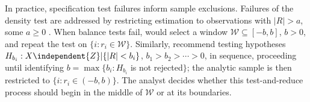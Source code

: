 In practice, specification test failures inform sample exclusions.
Failures of the density test are addressed by restricting
estimation to observations with $|R|>a$, some $a \geq 0$
\citep[e.g.,][]{barrecaetal2011birthweightRDD,eggers2014validity}.
When balance tests fail,
\citet{lee2010regression} would select a window
$\mathcal{W} \subseteq [-b, b]$, $b>0$, %
and repeat the test on $\{i : r_{i} \in \mathcal{W}\}$. Similarly,
\citet{cattaneo2014randomization} recommend testing hypotheses
$H_{b_{i}}: {X} \independent {Z}| \{|R| < b_{i}\}$, $b_1 > b_2 > \cdots >0$, in sequence,
proceeding until identifying  $b = \max \{ b_i: H_{b_{i}}$ is not rejected$\}$;
the analytic sample is then restricted to  $\{i: r_{i} \in (-b,b)\}$.
The analyst decides whether this test-and-reduce process
should begin in the middle of $\mathcal{W}$ or at its boundaries.



